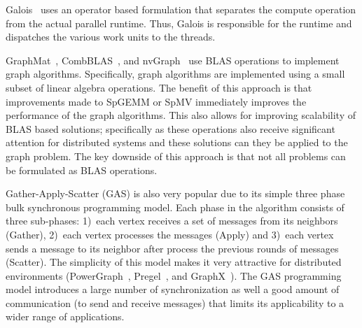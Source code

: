 Galois~\cite{pingali2011tao} uses an operator based formulation that separates the compute operation from the actual parallel runtime. Thus, Galois is responsible for the runtime and dispatches the various work units to the threads.



GraphMat~\cite{Sundaram:2015:GHP:2809974.2809983}, CombBLAS~\cite{Buluc:2011:CBD:2076556.2076566}, and nvGraph~\cite{nvGraph} use BLAS operations to implement graph algorithms. Specifically, graph algorithms are implemented using a small subset of linear algebra operations.
The benefit of this approach is that improvements made to SpGEMM or SpMV immediately improves the performance of the graph algorithms. This also allows for improving scalability of BLAS based solutions; specifically as these operations also receive significant attention for distributed systems and these solutions can they be applied to the graph problem.
The key downside of this approach is that not all problems can be formulated as BLAS operations.



Gather-Apply-Scatter (GAS) is also very popular due to its simple three phase bulk synchronous programming model. Each phase in the algorithm consists of three sub-phases: 1)~each vertex receives a set of messages from its neighbors (Gather), 2)~each vertex processes the messages (Apply) and 3)~each vertex sends a message to its neighbor after process the previous rounds of messages (Scatter). The simplicity of this model makes it very attractive for distributed environments (PowerGraph~\cite{powergraph}, Pregel~\cite{pregel}, and GraphX~\cite{gonzalez2014graphx}). The GAS programming model introduces a large number of synchronization as well a good amount of communication (to send and receive messages) that limits its applicability to a wider range of applications.
